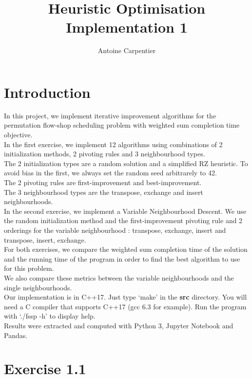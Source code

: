 \documentclass[a4paper,10pt]{article}
\title{Heuristic Optimisation\\Implementation 1}
\author{Antoine Carpentier}
\begin{document}
\maketitle

\section{Introduction}

In this project, we implement iterative improvement algorithms for the permutation flow-shop scheduling problem with weighted sum completion time objective. \\

In the first exercise, we implement 12 algorithms using combinations of 2 initialization methods, 2 pivoting rules and 3 neighbourhood types. \\
The 2 initialization types are a random solution and a simplified RZ heuristic. To avoid bias in the first, we always set the random seed arbitrarely to 42. \\
The 2 pivoting rules are first-improvement and best-improvement. \\
The 3 neighbourhood types are the transpose, exchange and insert neighbourhoods. \\

In the second exercise, we implement a Variable Neighbourhood Descent. We use the random initialization method and the first-improvement pivoting rule and 2 orderings for the variable neighbourhood : transpose, exchange, insert and transpose, insert, exchange. \\

For both exercises, we compare the weighted sum completion time of the solution and the running time of the program in order to find the best algorithm to use for this problem. \\

We also compare these metrics between the variable neighbourhoods and the single neighbourhoods. \\

Our implementation is in C++17. Just type `make' in the \textbf{src} directory. You will need a C compiler that supports C++17 (gcc 6.3 for example). Run the program with `./fssp -h' to display help. \\

Results were extracted and computed with Python 3, Jupyter Notebook and Pandas.

\section{Exercise 1.1}
\end{document}
